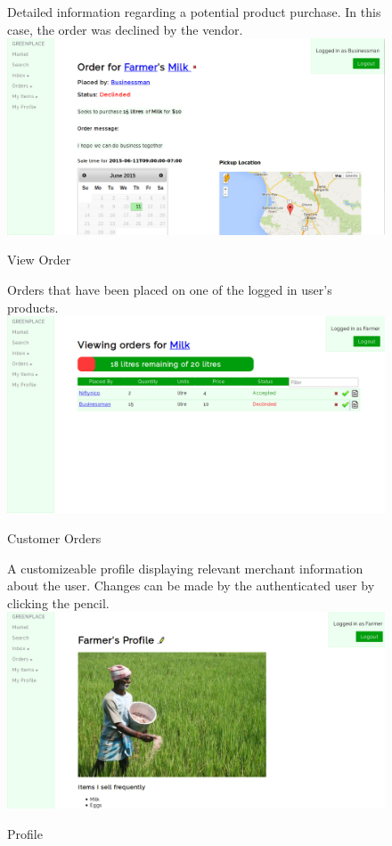 \documentclass[letterpaper, 10 pt, conference]{ieeeconf}  %
\begin{document}
\begin{figure}[H]
  \caption{View Order}
  Detailed information regarding a potential product purchase. In this case, the order was declined by the vendor.\\
  \label{fig:orderview}
  \centering
    \includegraphics[width=\textwidth]{images/orderview.png}
\end{figure}

\begin{figure}[H]
  \caption{Customer Orders}
  Orders that have been placed on one of the logged in user's products.\\
  \label{fig:customerorders}
  \centering
    \includegraphics[width=\textwidth]{images/customerorders.png}
\end{figure}

\begin{figure}[H]
  \caption{Profile}
  A customizeable profile displaying relevant merchant information about the user. Changes can be made by the authenticated user by clicking the pencil.\\
  \label{fig:profile}
  \centering
    \includegraphics[width=\textwidth]{images/profile.png}
\end{figure}
\end{document}
